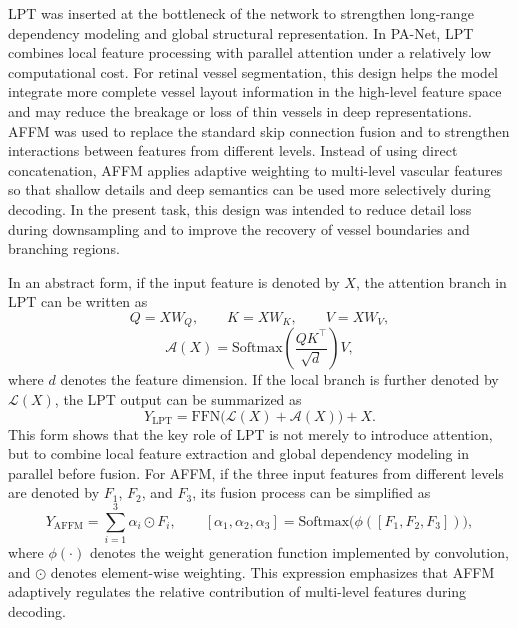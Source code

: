 \documentclass[a4paper,12pt]{article}
\begin{document}
LPT was inserted at the bottleneck of the network to strengthen long-range dependency modeling and global structural representation. In PA-Net, LPT combines local feature processing with parallel attention under a relatively low computational cost. For retinal vessel segmentation, this design helps the model integrate more complete vessel layout information in the high-level feature space and may reduce the breakage or loss of thin vessels in deep representations. AFFM was used to replace the standard skip connection fusion and to strengthen interactions between features from different levels. Instead of using direct concatenation, AFFM applies adaptive weighting to multi-level vascular features so that shallow details and deep semantics can be used more selectively during decoding. In the present task, this design was intended to reduce detail loss during downsampling and to improve the recovery of vessel boundaries and branching regions.

In an abstract form, if the input feature is denoted by \(X\), the attention branch in LPT can be written as
\[
Q = XW_Q,\qquad K = XW_K,\qquad V = XW_V,
\]
\[
\mathcal{A}(X) = \mathrm{Softmax}\left(\frac{QK^{\top}}{\sqrt{d}}\right)V,
\]
where \(d\) denotes the feature dimension. If the local branch is further denoted by \(\mathcal{L}(X)\), the LPT output can be summarized as
\[
Y_{\mathrm{LPT}} = \mathrm{FFN}\big(\mathcal{L}(X) + \mathcal{A}(X)\big) + X.
\]
This form shows that the key role of LPT is not merely to introduce attention, but to combine local feature extraction and global dependency modeling in parallel before fusion. For AFFM, if the three input features from different levels are denoted by \(F_1\), \(F_2\), and \(F_3\), its fusion process can be simplified as
\[
Y_{\mathrm{AFFM}} = \sum_{i=1}^{3}\alpha_i \odot F_i,\qquad
[\alpha_1,\alpha_2,\alpha_3] = \mathrm{Softmax}\big(\phi([F_1,F_2,F_3])\big),
\]
where \(\phi(\cdot)\) denotes the weight generation function implemented by convolution, and \(\odot\) denotes element-wise weighting. This expression emphasizes that AFFM adaptively regulates the relative contribution of multi-level features during decoding.
\end{document}
